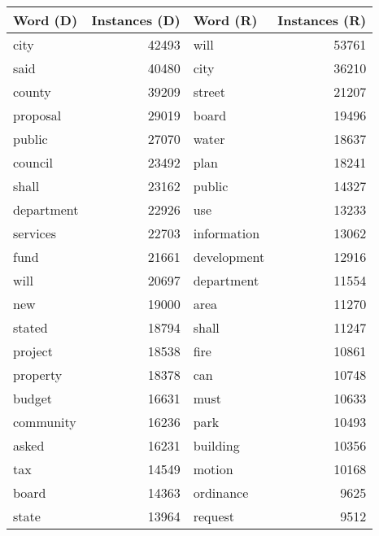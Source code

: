 \begin{table}[ht]
\centering
\begingroup\fontsize{9pt}{10pt}\selectfont
\begin{tabular}{lrlr}
  \hline
Word (D) & Instances (D) & Word (R) & Instances (R) \\ 
  \hline
city & 42493 & will & 53761 \\ 
  said & 40480 & city & 36210 \\ 
  county & 39209 & street & 21207 \\ 
  proposal & 29019 & board & 19496 \\ 
  public & 27070 & water & 18637 \\ 
  council & 23492 & plan & 18241 \\ 
  shall & 23162 & public & 14327 \\ 
  department & 22926 & use & 13233 \\ 
  services & 22703 & information & 13062 \\ 
  fund & 21661 & development & 12916 \\ 
  will & 20697 & department & 11554 \\ 
  new & 19000 & area & 11270 \\ 
  stated & 18794 & shall & 11247 \\ 
  project & 18538 & fire & 10861 \\ 
  property & 18378 & can & 10748 \\ 
  budget & 16631 & must & 10633 \\ 
  community & 16236 & park & 10493 \\ 
  asked & 16231 & building & 10356 \\ 
  tax & 14549 & motion & 10168 \\ 
  board & 14363 & ordinance & 9625 \\ 
  state & 13964 & request & 9512 \\ 
   \hline
\end{tabular}
\endgroup
\label{tabLDAIN}
\end{table}

